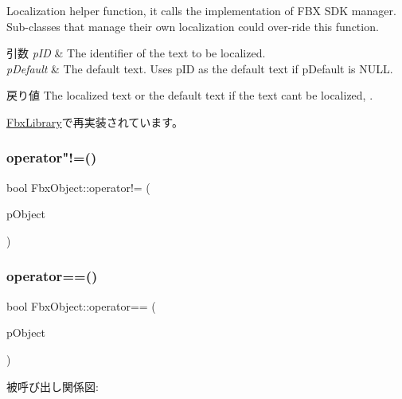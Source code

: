 Localization helper function, it calls the implementation of F\+BX S\+DK manager. Sub-\/classes that manage their own localization could over-\/ride this function. 
\begin{DoxyParams}{引数}
{\em p\+ID} & The identifier of the text to be localized. \\
\hline
{\em p\+Default} & The default text. Uses p\+ID as the default text if p\+Default is N\+U\+LL. \\
\hline
\end{DoxyParams}
\begin{DoxyReturn}{戻り値}
The localized text or the default text if the text can\textquotesingle{}t be localized, . 
\end{DoxyReturn}


\hyperlink{class_fbx_library_a6f71bf208f95cc8033123e173e64b298}{Fbx\+Library}で再実装されています。

\mbox{\label{class_fbx_object_a9bdaa7d7553dc65fde0138f0e60be723}} 
\subsubsection{\texorpdfstring{operator"!=()}{operator!=()}}
{\footnotesize\ttfamily bool Fbx\+Object\+::operator!= (\begin{DoxyParamCaption}\item[{const \hyperlink{class_fbx_object}{Fbx\+Object} \&}]{p\+Object }\end{DoxyParamCaption})}

\mbox{\label{class_fbx_object_affe87473b7a6485c7c7ad6e4184a0cad}} 
\subsubsection{\texorpdfstring{operator==()}{operator==()}}
{\footnotesize\ttfamily bool Fbx\+Object\+::operator== (\begin{DoxyParamCaption}\item[{const \hyperlink{class_fbx_object}{Fbx\+Object} \&}]{p\+Object }\end{DoxyParamCaption})}

被呼び出し関係図\+:
\mbox{\label{class_fbx_object_a68b9ad65d98d7be9cb252949bc709385}} 
